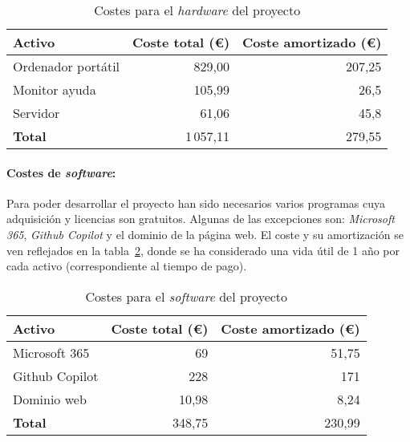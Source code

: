 \begin{table}[H]
	\centering
	\begin{tabular}{lrr}
		\toprule
		\textbf{Activo}      & \textbf{Coste total (€)}      & \textbf{Coste amortizado (€)}      \\ \midrule
		Ordenador portátil     & 829,00                    & 207,25                      \\
		Monitor ayuda			& 105,99 						& 26,5							\\
		Servidor             & 61,06                    &  45,8                     \\ \midrule
		\textbf{Total}       & 1\,057,11                   & 279,55                      \\ \midrule
	\end{tabular}
	\caption{Costes para el \textit{hardware} del proyecto}
	\label{tabla:hw}
\end{table}

\paragraph{Costes de \textit{software}:} Para poder desarrollar el proyecto han sido necesarios varios programas cuya adquisición y licencias son gratuitos. Algunas de las excepciones son: \textit{Microsoft 365}, \textit{Github Copilot} y el dominio de la página web. El coste y su amortización se ven reflejados en la tabla~\ref{tabla:sw}, donde se ha considerado una vida útil de 1 año por cada activo (correspondiente al tiempo de pago).

\begin{table}[H]
	\centering
	\begin{tabular}{lrr}
		\toprule
		\textbf{Activo}      & \textbf{Coste total (€)}      & \textbf{Coste amortizado (€)}      \\ \midrule
		Microsoft 365     & 69                    & 51,75                      \\
		Github Copilot			& 228 						& 171							\\
		Dominio web             & 10,98                    & 8,24                     \\ \midrule
		\textbf{Total}       & 348,75                   & 230,99                      \\ \midrule
	\end{tabular}
	\caption{Costes para el \textit{software} del proyecto}
	\label{tabla:sw}
\end{table}

